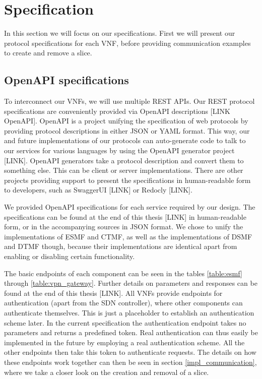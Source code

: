 \section{Specification}
\label{impl_specification}
In this section we will focus on our specifications. First we will present our protocol specifications for each VNF, before providing communication examples to create and remove a slice.

\subsection{OpenAPI specifications}
To interconnect our VNFs, we will use multiple REST APIs. Our REST protocol specifications are conveniently provided via OpenAPI descriptions [LINK OpenAPI]. OpenAPI is a project unifying the specification of web protocols by providing protocol descriptions in either JSON or YAML format. This way, our and future implementations of our protocols can auto-generate code to talk to our services for various languages by using the OpenAPI generator project [LINK]. OpenAPI generators take a protocol description and convert them to something else. This can be client or server implementations. There are other projects providing support to present the specifications in human-readable form to developers, such as SwaggerUI [LINK] or Redocly [LINK].

We provided OpenAPI specifications for each service required by our design. The specifications can be found at the end of this thesis [LINK] in human-readable form, or in the accompanying sources in JSON format. We chose to unify the implementations of ESMF and CTMF, as well as the implementations of DSMF and DTMF though, because their implementations are identical apart from enabling or disabling certain functionality.

The basic endpoints of each component can be seen in the tables \ref{table:esmf} through \ref{table:vpn_gateway}. Further details on parameters and responses can be found at the end of this thesis [LINK]. All VNFs provide endpoints for authentication (apart from the SDN controller), where other components can authenticate themselves. This is just a placeholder to establish an authentication scheme later. In the current specification the authentication endpoint takes no parameters and returns a predefined token. Real authentication can thus easily be implemented in the future by employing a real authentication scheme. All the other endpoints then take this token to authenticate requests. The details on how these endpoints work together can then be seen in section \ref{impl_communication}, where we take a closer look on the creation and removal of a slice.

